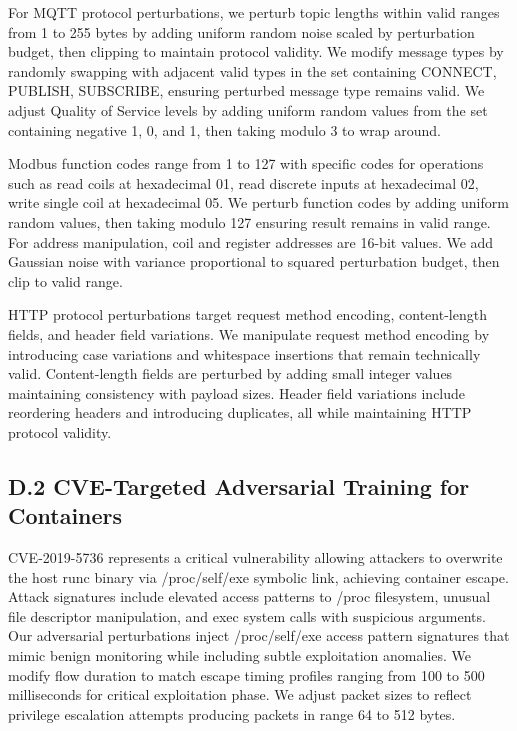 \documentclass[12pt,a4paper]{article}
\theoremstyle{definition}
\begin{document}
For MQTT protocol perturbations, we perturb topic lengths within valid ranges from 1 to 255 bytes by adding uniform random noise scaled by perturbation budget, then clipping to maintain protocol validity. We modify message types by randomly swapping with adjacent valid types in the set containing CONNECT, PUBLISH, SUBSCRIBE, ensuring perturbed message type remains valid. We adjust Quality of Service levels by adding uniform random values from the set containing negative 1, 0, and 1, then taking modulo 3 to wrap around.

Modbus function codes range from 1 to 127 with specific codes for operations such as read coils at hexadecimal 01, read discrete inputs at hexadecimal 02, write single coil at hexadecimal 05. We perturb function codes by adding uniform random values, then taking modulo 127 ensuring result remains in valid range. For address manipulation, coil and register addresses are 16-bit values. We add Gaussian noise with variance proportional to squared perturbation budget, then clip to valid range.

HTTP protocol perturbations target request method encoding, content-length fields, and header field variations. We manipulate request method encoding by introducing case variations and whitespace insertions that remain technically valid. Content-length fields are perturbed by adding small integer values maintaining consistency with payload sizes. Header field variations include reordering headers and introducing duplicates, all while maintaining HTTP protocol validity.

\subsection{D.2 CVE-Targeted Adversarial Training for Containers}

CVE-2019-5736 represents a critical vulnerability allowing attackers to overwrite the host runc binary via /proc/self/exe symbolic link, achieving container escape. Attack signatures include elevated access patterns to /proc filesystem, unusual file descriptor manipulation, and exec system calls with suspicious arguments. Our adversarial perturbations inject /proc/self/exe access pattern signatures that mimic benign monitoring while including subtle exploitation anomalies. We modify flow duration to match escape timing profiles ranging from 100 to 500 milliseconds for critical exploitation phase. We adjust packet sizes to reflect privilege escalation attempts producing packets in range 64 to 512 bytes.
\end{document}

